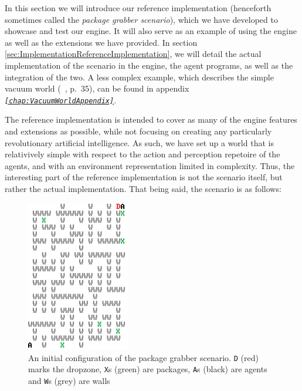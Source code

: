 In this section we will introduce our reference implementation (henceforth
sometimes called the \emph{package grabber scenario}), which we have
developed to showcase and test our engine. It will also serve as an
example of using the engine as well as the extensions we have provided.
In section \ref{sec:ImplementationReferenceImplementation}, we will
detail the actual implementation of the scenario in the engine, the
agent programs, as well as the integration of the two. A less complex
example, which describes the simple vacuum world (~\cite{Norvig96},
p.\ 35), can be found in appendix\texttt{\emph{ \ref{chap:VacuumWorldAppendix}}}.

The reference implementation is intended to cover as many of the engine
features and extensions as possible, while not focusing on creating
any particularly revolutionary artificial intelligence. As such, we
have set up a world that is relativively simple with respect to the
action and perception repetoire of the agents, and with an environment
representation limited in complexity. Thus, the interesting part of
the reference implementation is not the scenario itself, but rather
the actual implementation. That being said, the scenario is as follows:

\begin{figure}
\begin{centering}
\includegraphics[width=0.4\textwidth]{TileWorldColoredScrot}
\par\end{centering}

\caption{An initial configuration of the package grabber scenario. \texttt{D}
(red) marks the dropzone, \texttt{X}s (green) are packages, \texttt{A}s
(black) are agents and \texttt{W}s (grey) are walls\label{fig:maze-scrot}}
\end{figure}


